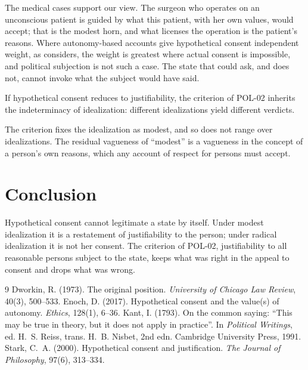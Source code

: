 \documentclass{situationist-preprint}
\begin{document}
\begin{reply}
The medical cases support our view. The surgeon who operates on an unconscious patient is guided by what this patient, with her own values, would accept; that is the modest horn, and what licenses the operation is the patient's reasons. Where autonomy-based accounts give hypothetical consent independent weight, as \citet{Enoch2017} considers, the weight is greatest where actual consent is impossible, and political subjection is not such a case. The state that could ask, and does not, cannot invoke what the subject would have said.
\end{reply}

\begin{objection}
If hypothetical consent reduces to justifiability, the criterion of POL-02 inherits the indeterminacy of idealization: different idealizations yield different verdicts.
\end{objection}

\begin{reply}
The criterion fixes the idealization as modest, and so does not range over idealizations. The residual vagueness of \enquote{modest} is a vagueness in the concept of a person's own reasons, which any account of respect for persons must accept.
\end{reply}

\section{Conclusion}

Hypothetical consent cannot legitimate a state by itself. Under modest idealization it is a restatement of justifiability to the person; under radical idealization it is not her consent. The criterion of POL-02, justifiability to all reasonable persons subject to the state, keeps what was right in the appeal to consent and drops what was wrong.

\begin{thebibliography}{9}
 Dworkin, R. (1973). The original position. \emph{University of Chicago Law Review}, 40(3), 500--533.
 Enoch, D. (2017). Hypothetical consent and the value(s) of autonomy. \emph{Ethics}, 128(1), 6--36.
 Kant, I. (1793). On the common saying: \enquote{This may be true in theory, but it does not apply in practice}. In \emph{Political Writings}, ed. H.~S. Reiss, trans. H.~B. Nisbet, 2nd edn. Cambridge University Press, 1991.
 Stark, C.~A. (2000). Hypothetical consent and justification. \emph{The Journal of Philosophy}, 97(6), 313--334.
\end{thebibliography}
\end{document}
